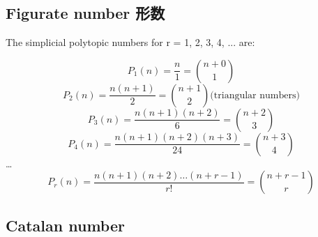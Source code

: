 \subsection{Figurate number 形数}
The simplicial polytopic numbers for r = 1, 2, 3, 4, ... are:\cite{comb4}

\begin{equation}
P_1(n) = \frac{n}{1} = {{n+0}\choose{1}}
\end{equation}
\begin{equation}
P_2(n) = \frac{n(n+1)}{2} = {{n+1}\choose{2}} \mbox{(triangular numbers)}
\end{equation}
\begin{equation}
P_3(n) = \frac{n(n+1)(n+2)}{6} = {{n+2}\choose{3}}
\end{equation}
\begin{equation}
P_4(n) = \frac{n(n+1)(n+2)(n+3)}{24} = {{n+3}\choose{4}}
\end{equation}
\ldots\\
\begin{equation}
P_r(n) = \frac{n(n+1)(n+2)\ldots(n+r-1)}{r!} = {{n+r-1}\choose{r}}
\end{equation}

\subsection{Catalan number}
